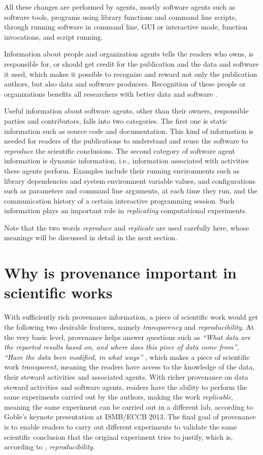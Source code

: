All these changes are performed by agents, mostly software agents such as software tools, programs 
using library functions and command line scripts, through running software in command line, GUI or 
interactive mode, function invocations, and script running.

Information about people and organization agents tells the readers who owns, is responsible for, or 
should get credit for the publication and the data and software it used, which makes it possible to 
recognize and reward not only the publication authors, but also data and software producers. 
Recognition of these people or organizations benefits all researchers with better data and software 
\cite{parsons2010data, goble2014better}. 

Useful information about software agents, other than their owners, responsible parties and 
contributors, falls into two categories. The first one is static information such as source code and 
documentation. This kind of information is needed for readers of the publications to understand and 
reuse the software to \emph{reproduce} the scientific conclusions. The second category of software 
agent information is dynamic information, i.e., information associated with activities these agents 
perform. Examples include their running environments such as library dependencies and system 
environment variable values, and configurations such as parameters and command line arguments, at 
each time they run, and the communication history of a certain interactive programming session. Such 
information plays an important role in \emph{replicating} computational experiments.

Note that the two words \emph{reproduce} and \emph{replicate} are used carefully here, whose meanings 
will be discussed in detail in the next section.


\section{Why is provenance important in scientific works}
With sufficiently rich provenance information, a piece of scientific work would get the following two 
desirable features, namely \emph{transparency} and \emph{reproducibility}. At the very basic level, 
provenance helps answer questions such as \emph{``What data are the reported results based on, and 
where does this piece of data come from''}, \emph{``Have the data been modified, in what ways''} 
\cite{davidson2008provenance}, which makes a piece of scientific work \emph{transparent}, meaning the 
readers have access to the knowledge of the data, their steward activities and associated agents. 
With richer provenance on data steward activities and software agents, readers have the ability to 
perform the same experiments carried out by the authors, making the work \emph{replicable}, meaning 
the same experiment can be carried out in a different lab, according to Goble's keynote presentation 
at ISMB/ECCB 2013. The final goal of provenance is to enable readers to carry out different 
experiments to validate the same scientific conclusion that the original experiment tries to justify, 
which is, according to \cite{drummond2009replicability}, \emph{reproducibility}.


